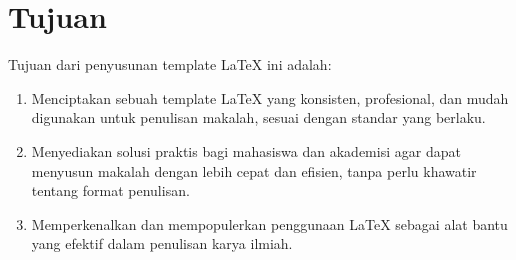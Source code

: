 \section{Tujuan}

Tujuan dari penyusunan template LaTeX ini adalah:

\begin{enumerate}
    \item Menciptakan sebuah template LaTeX yang konsisten, profesional, dan mudah digunakan untuk penulisan makalah, sesuai dengan standar yang berlaku.
    \item Menyediakan solusi praktis bagi mahasiswa dan akademisi agar dapat menyusun makalah dengan lebih cepat dan efisien, tanpa perlu khawatir tentang format penulisan.
    \item Memperkenalkan dan mempopulerkan penggunaan LaTeX sebagai alat bantu yang efektif dalam penulisan karya ilmiah.
\end{enumerate}